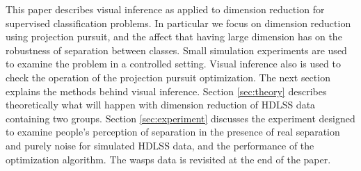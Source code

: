 \documentclass[12]{article}
\begin{document}
This paper describes visual inference as applied to dimension reduction for supervised classification problems. In particular we focus on dimension reduction using projection pursuit, and the affect that having large dimension has on the robustness of separation between classes.  Small simulation experiments are used to examine the problem in a controlled setting. Visual inference also is used to check the operation of the projection pursuit optimization. The next section explains the methods behind visual inference. Section \ref{sec:theory} describes theoretically what will happen with dimension reduction of HDLSS data containing two groups. Section \ref{sec:experiment} discusses the experiment designed to examine people's perception of separation in the presence of real separation and purely noise for simulated HDLSS data, and the performance of the optimization algorithm. The wasps data is revisited at the end of the paper. 
\end{document}
